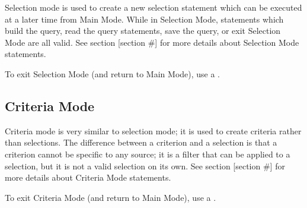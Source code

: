 Selection mode is used to create a new selection statement which can be executed at a later time from Main Mode. 
While in Selection Mode, statements which build the query, read the query statements, save the query, or exit 
Selection Mode are all valid. See section [section #] for more details about Selection Mode statements.

To exit Selection Mode (and return to Main Mode), use a .

\subsection{Criteria Mode}
Criteria mode is very similar to selection mode; it is used to create criteria rather than selections. 
The difference between a criterion and a selection is that a criterion cannot be specific to any source; 
it is a filter that can be applied to a selection, but it is not a valid selection on its own. 
See section [section #] for more details about Criteria Mode statements.

To exit Criteria Mode (and return to Main Mode), use a .

